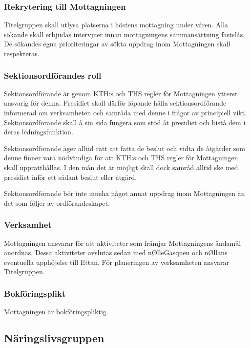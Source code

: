\documentclass{dgovdoc}
\begin{document}
\subsubsection{Rekrytering till Mottagningen}

Titelgruppen skall utlysa platserna i höstens mottagning under våren. Alla
sökande skall erbjudas intervjuer innan mottagningens sammansättning fastslås.
De sökandes egna prioriteringar av sökta uppdrag inom Mottagningen skall
respekteras.

\subsubsection{Sektionsordförandes roll}

Sektionsordförande är genom KTH:s och THS regler för Mottagningen ytterst
ansvarig för denna. Presidiet skall därför löpande hålla sektionsordförande
informerad om verksamheten och samråda med denne i frågor av principiell vikt.
Sektionsordförande skall å sin sida fungera som stöd åt presidiet och bistå dem
i deras ledningsfunktion.

Sektionsordförande äger alltid rätt att fatta de beslut och vidta de åtgärder
som denne finner vara nödvändiga för att KTH:s och THS regler för Mottagningen
skall upprätthållas. I den mån det är möjligt skall dock samråd alltid ske med
presidiet inför ett sådant beslut eller åtgärd.

Sektionsordförande bör inte inneha något annat uppdrag inom Mottagningen än det
som följer av ordförandeskapet.

\subsubsection{Verksamhet}

Mottagningen ansvarar för att aktiviteter som främjar Mottagningens ändamål
anordnas. Dessa aktiviteter avslutas sedan med nØlleGasquen och nØllans
eventuella upphöjelse till Ettan. För planeringen av verksamheten ansvarar
Titelgruppen.

\subsubsection{Bokföringsplikt}

Mottagningen är bokföringspliktig.

\subsection{Näringslivsgruppen}
\end{document}

